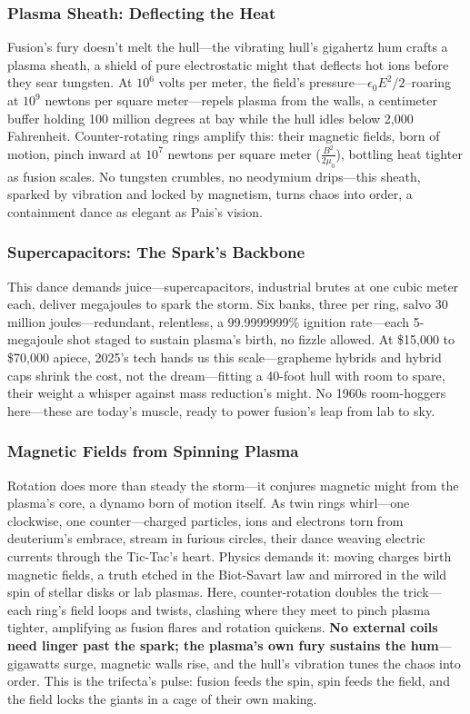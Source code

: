 \documentclass[11pt]{article}
\begin{document}
	\subsubsection{Plasma Sheath: Deflecting the Heat}
	Fusion’s fury doesn’t melt the hull—the vibrating hull’s gigahertz hum crafts a plasma sheath, a shield of pure electrostatic might that deflects hot ions before they sear tungsten. At $10^6$ volts per meter, the field’s pressure—\(\epsilon_0 E^2 / 2\)--roaring at $10^9$ newtons per square meter—repels plasma from the walls, a centimeter buffer holding 100 million degrees at bay while the hull idles below 2,000 Fahrenheit. Counter-rotating rings amplify this: their magnetic fields, born of motion, pinch inward at $10^7$ newtons per square meter (\(\frac{B^2}{2\mu_0}\)), bottling heat tighter as fusion scales. No tungsten crumbles, no neodymium drips—this sheath, sparked by vibration and locked by magnetism, turns chaos into order, a containment dance as elegant as Pais’s vision.
	
	\subsubsection{Supercapacitors: The Spark’s Backbone}
	This dance demands juice—supercapacitors, industrial brutes at one cubic meter each, deliver megajoules to spark the storm. Six banks, three per ring, salvo 30 million joules—redundant, relentless, a 99.9999999\% ignition rate—each 5-megajoule shot staged to sustain plasma’s birth, no fizzle allowed. At \$15,000 to \$70,000 apiece, 2025’s tech hands us this scale—grapheme hybrids and hybrid caps shrink the cost, not the dream—fitting a 40-foot hull with room to spare, their weight a whisper against mass reduction’s might. No 1960s room-hoggers here—these are today’s muscle, ready to power fusion’s leap from lab to sky.
	
	\subsubsection{Magnetic Fields from Spinning Plasma}
	Rotation does more than steady the storm—it conjures magnetic might from the plasma’s core, a dynamo born of motion itself. As twin rings whirl—one clockwise, one counter—charged particles, ions and electrons torn from deuterium’s embrace, stream in furious circles, their dance weaving electric currents through the Tic-Tac’s heart. Physics demands it: moving charges birth magnetic fields, a truth etched in the Biot-Savart law \cite{biot1820} and mirrored in the wild spin of stellar disks or lab plasmas. Here, counter-rotation doubles the trick—each ring’s field loops and twists, clashing where they meet to pinch plasma tighter, amplifying as fusion flares and rotation quickens. \textbf{No external coils need linger past the spark; the plasma's own fury sustains the hum}—gigawatts surge, magnetic walls rise, and the hull’s vibration tunes the chaos into order. This is the trifecta’s pulse: fusion feeds the spin, spin feeds the field, and the field locks the giants in a cage of their own making.
	
\end{document}
